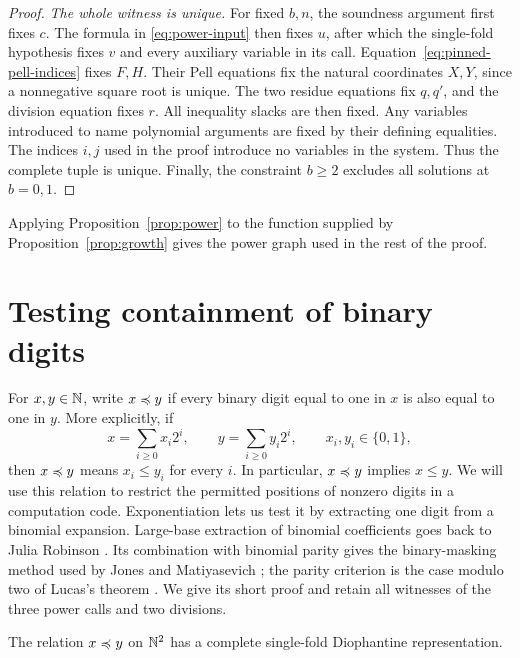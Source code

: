 \begin{proof}
\smallskip
\noindent\emph{The whole witness is unique.}
For fixed $b,n$, the soundness argument first fixes $c$.
The formula in \eqref{eq:power-input} then fixes $u$, after which the
single-fold hypothesis fixes $v$ and every auxiliary variable in its
call.  Equation~\eqref{eq:pinned-pell-indices} fixes $F,H$.
Their Pell equations fix the natural coordinates $X,Y$, since a
nonnegative square root is unique.  The two residue equations fix
$q,q'$, and the division equation fixes $r$.
All inequality slacks are then fixed.  Any variables introduced to
name polynomial arguments are fixed by their defining equalities.
The indices $i,j$ used in the proof introduce no variables in the
system.  Thus the complete tuple is unique.  Finally, the constraint
$b\ge2$ excludes all solutions at $b=0,1$.
\end{proof}

Applying Proposition~\ref{prop:power} to the function supplied by
Proposition~\ref{prop:growth} gives the power graph used in the rest
of the proof.

\section{Testing containment of binary digits}\label{sec:subset}

For $x,y\in\mathbb N$, write $x\preccurlyeq y$ if every binary digit equal to one
in $x$ is also equal to one in $y$.  More explicitly, if
\[
 x=\sum_{i\ge0}x_i2^i,\qquad y=\sum_{i\ge0}y_i2^i,
 \qquad x_i,y_i\in\{0,1\},
\]
then $x\preccurlyeq y$ means $x_i\le y_i$ for every $i$.
In particular, $x\preccurlyeq y$ implies $x\le y$.
We will use this relation to restrict the permitted positions of
nonzero digits in a computation code.  Exponentiation lets us test it
by extracting one digit from a binomial expansion.
Large-base extraction of binomial coefficients goes back to Julia
Robinson \cite[Section~5]{robinson1952}.  Its combination with binomial
parity gives the binary-masking method used by
Jones and Matiyasevich \cite[Section~3]{jm1991}; the parity criterion is
the case modulo two of Lucas's theorem \cite[Section~3, p.~52]{lucas1878}.
We give its short proof and
retain all witnesses of the three power calls and two divisions.

\begin{proposition}\label{prop:subset}
The relation $x\preccurlyeq y$ on $\mathbb N^2$ has a complete single-fold
Diophantine representation.
\end{proposition}

